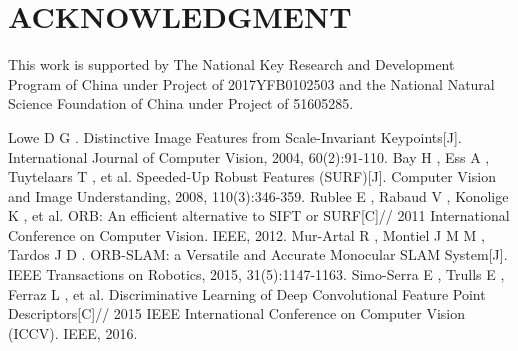 \documentclass[conference]{IEEEtran}
\begin{document}
\section*{ACKNOWLEDGMENT}

This work is supported by The National Key Research and Development Program of China under Project of 2017YFB0102503 and the National Natural Science Foundation of China under Project of 51605285.




\begin{thebibliography}{99}









 Lowe D G . Distinctive Image Features from Scale-Invariant Keypoints[J]. International Journal of Computer Vision, 2004, 60(2):91-110.
 Bay H , Ess A , Tuytelaars T , et al. Speeded-Up Robust Features (SURF)[J]. Computer Vision and Image Understanding, 2008, 110(3):346-359.
 Rublee E , Rabaud V , Konolige K , et al. ORB: An efficient alternative to SIFT or SURF[C]// 2011 International Conference on Computer Vision. IEEE, 2012.
 Mur-Artal R , Montiel J M M , Tardos J D . ORB-SLAM: a Versatile and Accurate Monocular SLAM System[J]. IEEE Transactions on Robotics, 2015, 31(5):1147-1163.
 Simo-Serra E , Trulls E , Ferraz L , et al. Discriminative Learning of Deep Convolutional Feature Point Descriptors[C]// 2015 IEEE International Conference on Computer Vision (ICCV). IEEE, 2016.



\end{thebibliography}
\end{document}

